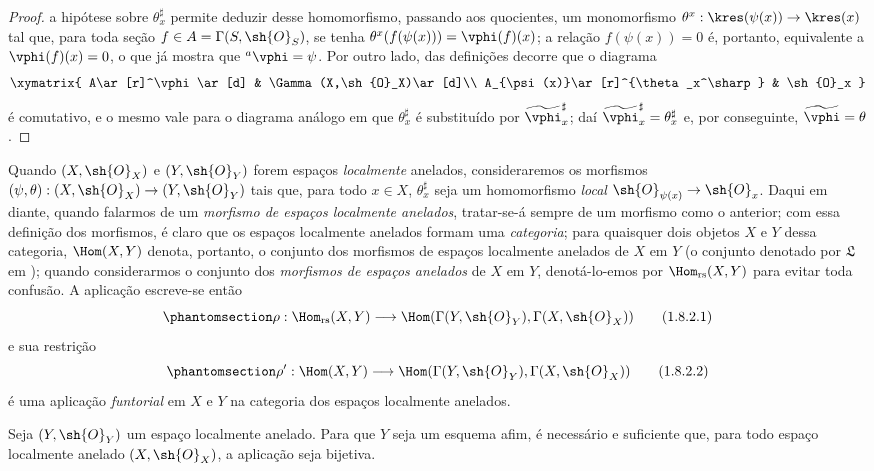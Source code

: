 \documentclass[oneside]{amsart}
\makeatletter
\newcommand{\ega@arrow}[2]{\mathchoice{#1}{#2}{#2}{#2}}
\renewcommand{\to}{\ega@arrow{\longrightarrow}{\rightarrow}}
\newcommand{\oldpage}[2][]{{\marginnote{\normalfont\textbf{#1}~|~#2}}\ignorespaces}
\let\EGAOriginalLabel\label
\renewcommand{\label}[1]{\phantomsection\EGAOriginalLabel{#1}}
\makeatother
\begin{document}
\begin{proof}
a hipótese sobre $\theta_x^\sharp$ permite deduzir desse homomorfismo,
passando aos quocientes, um monomorfismo
$\theta^x:\kres(\psi(x))\to\kres(x)$ tal que, para toda seção
$f\in A=\Gamma(S,\sh{O}_S)$, se tenha
$\theta^x(f(\psi(x)))=\vphi(f)(x)$;
a relação $f(\psi(x))=0$ é, portanto, equivalente a
$\vphi(f)(x)=0$, o que já mostra que ${}^a\vphi=\psi$.
Por outro lado, das definições decorre que o diagrama
\[
  \xymatrix{
    A\ar[r]^\vphi\ar[d] &
    \Gamma(X,\sh{O}_X)\ar[d]\\
    A_{\psi(x)}\ar[r]^{\theta_x^\sharp} &
    \sh{O}_x
  }
\]
é comutativo, e o mesmo vale para o diagrama análogo em que
$\theta_x^\sharp$ é substituído por $\widetilde{\vphi}_x^\sharp$; daí
$\widetilde{\vphi}_x^\sharp=\theta_x^\sharp$  e, por
conseguinte, $\widetilde{\vphi}=\theta$.
\end{proof}

\begin{env}[1.8.2]
\label{I.1.8.2}
Quando $(X,\sh{O}_X)$ e $(Y,\sh{O}_Y)$ forem espaços
\emph{localmente} anelados, consideraremos os morfismos
$(\psi,\theta):(X,\sh{O}_X)\to(Y,\sh{O}_Y)$ tais que, para todo
$x\in X$, $\theta_x^\sharp$ seja um homomorfismo \emph{local}
$\sh{O}_{\psi(x)}\to\sh{O}_x$.
Daqui em diante, quando falarmos
\oldpage[II]{219}
de um \emph{morfismo de espaços localmente anelados}, tratar-se-á sempre
de um morfismo como o anterior;
com essa definição dos morfismos, é claro que os espaços localmente
anelados formam uma \emph{categoria};
para quaisquer dois objetos $X$ e $Y$ dessa categoria, $\Hom(X,Y)$
denota, portanto, o conjunto dos morfismos de espaços localmente anelados
de $X$ em $Y$ (o conjunto denotado por $\mathfrak{L}$ em
);
quando considerarmos o conjunto dos \emph{morfismos de espaços anelados}
de $X$ em $Y$, denotá-lo-emos por $\Hom_\text{rs}(X,Y)$ para evitar toda
confusão.
A aplicação  escreve-se então
\[
  \label{I.1.8.2.1}
  \rho:\Hom_\text{rs}(X,Y)\to\Hom(\Gamma(Y,\sh{O}_Y),\Gamma(X,\sh{O}_X))
  \tag{1.8.2.1}
\]
e sua restrição
\[
  \label{I.1.8.2.2}
  \rho':\Hom(X,Y)\to\Hom(\Gamma(Y,\sh{O}_Y),\Gamma(X,\sh{O}_X))
  \tag{1.8.2.2}
\]
é uma aplicação \emph{funtorial} em $X$ e $Y$ na categoria dos espaços
localmente anelados.
\end{env}

\begin{corollary}[1.8.3]
\label{I.1.8.3}
Seja $(Y,\sh{O}_Y)$ um espaço localmente anelado.
Para que $Y$ seja um esquema afim, é necessário e suficiente que, para
todo espaço localmente anelado $(X,\sh{O}_X)$, a aplicação
 seja bijetiva.
\end{corollary}
\end{document}
